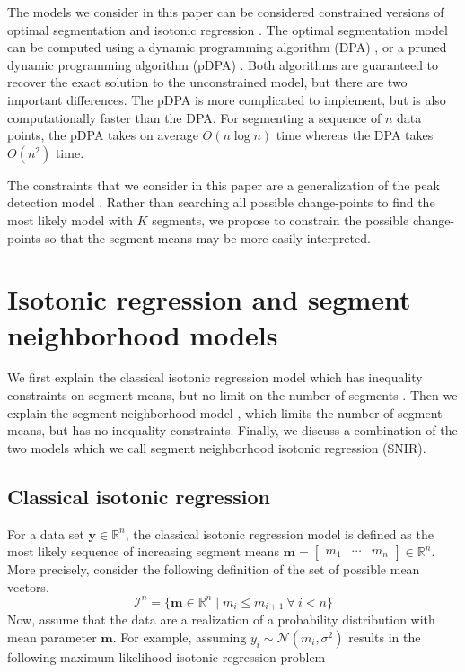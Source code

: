 \documentclass{article}
\newcommand{\RR}{\mathbb R}
\begin{document}
The models we consider in this paper can be considered constrained
versions of optimal segmentation \citep{Segmentor} and isotonic
regression \citep{mair2009isotone}. The optimal segmentation model can
be computed using a dynamic programming algorithm (DPA)
\citep{bellman, segment-neighborhood, optimal-partitioning}, or a
pruned dynamic programming algorithm (pDPA) \citep{pruned-dp}. Both
algorithms are guaranteed to recover the exact solution to the
unconstrained model, but there are two important differences. The pDPA
is more complicated to implement, but is also computationally faster
than the DPA. For segmenting a sequence of $n$ data points, the pDPA
takes on average $O(n\log n)$ time whereas the DPA takes $O(n^2)$
time.

The constraints that we consider in this paper are a generalization of
the peak detection model \citep{HOCKING-PeakSeg}. Rather than
searching all possible change-points to find the most likely model
with $K$ segments, we propose to constrain the possible change-points
so that the segment means may be more easily interpreted.

\section{Isotonic regression and segment neighborhood models}

We first explain the classical isotonic regression model which has
inequality constraints on segment means, but no limit on the number of
segments \citep{mair2009isotone}. Then we explain the segment
neighborhood model \citep{segment-neighborhood}, which limits the
number of segment means, but has no inequality constraints. Finally,
we discuss a combination of the two models which we call segment
neighborhood isotonic regression (SNIR).

\subsection{Classical isotonic regression}

For a data set $\mathbf y\in\RR^n$, the classical isotonic regression
model is defined as the most likely sequence of increasing segment
means $\mathbf m = \left[
\begin{array}{ccc}
  m_1& \cdots &m_n
\end{array}
\right]
\in\RR^n$. More precisely, consider the following definition
of the set of possible mean vectors.
\begin{equation}
  \mathcal I^n = \{\mathbf m\in\RR^n \mid m_i \leq m_{i+1} \ \forall\ i<n\}
\end{equation}
Now, assume that the data are a realization of a probability
distribution with mean parameter $\mathbf m$. For example, assuming
$y_i \sim \mathcal N(m_i, \sigma^2)$ results in the following maximum
likelihood isotonic regression problem
\end{document}
